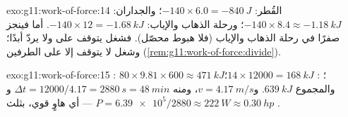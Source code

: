 \begin{solution}{exo:g11:work-of-force:14}
القُطر: $-140 \times 6.0 = -\qty{840}{J}$؛ والجداران:
$-140 \times 8.4 \approx -\qty{1.18}{kJ}$؛ ورحلة الذهاب والإياب:
$-140 \times 12 = -\qty{1.68}{kJ}$. أما  فينجز صفرًا في رحلة الذهاب
والإياب (فلا هبوط محصّل). فشغل  يتوقف على  ولا يردّ
أبدًا؛ وشغل  لا يتوقف إلا على الطرفين
(\cref{rem:g11:work-of-force:divide}).
\end{solution}

\begin{solution}{exo:g11:work-of-force:15}
: $80 \times 9.81 \times 600 \approx \qty{471}{kJ}$؛ :
$14 \times 12000 = \qty{168}{kJ}$؛ والمجموع $\qty{639}{kJ}$.
و$v = \qty{4.17}{m/s}$، ومنه $\Delta t = 12000/4.17 = \qty{2880}{s} =
\qty{48}{min}$ و$P = \num{6.39e5}/2880 \approx \qty{222}{W} \approx
\qty{0.30}{hp}$ --- أي هاوٍ قوي، بثلث .
\end{solution}

